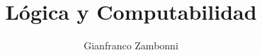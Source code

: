 

\title{Lógica y Computabilidad}
\author{Gianfranco Zambonni}



\newtheorem{definicion}{Definición}[section]
\newtheorem{teorema}{Teorema}[section]
\newtheorem{corolario}{Corolario}[section]
\newtheorem{proposicion}{Proposición}[section]
\newtheorem{lema}{Lema}[section]

	
	\maketitle
	\tableofcontents
	\newpage
		
	
	\newpage
	
	
	\appendix
	\newpage
	




